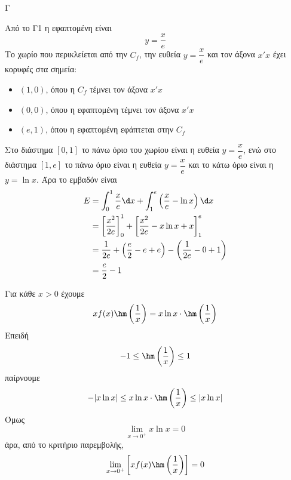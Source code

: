 \begin{thema}{Γ}
\begin{erwthma}
\item Από το Γ1 η εφαπτομένη είναι
\[y=\frac{x}{e}\]
Το χωρίο που περικλείεται από την $C_f$, την ευθεία $y=\dfrac{x}{e}$ και τον άξονα $x'x$ έχει κορυφές στα σημεία:
\begin{itemize}
\item $(1,0)$, όπου η $C_f$ τέμνει τον άξονα $x'x$
\item $(0,0)$, όπου η εφαπτομένη τέμνει τον άξονα $x'x$
\item $(e,1)$, όπου η εφαπτομένη εφάπτεται στην $C_f$
\end{itemize}
Στο διάστημα $[0,1]$ το πάνω όριο του χωρίου είναι η ευθεία $y=\dfrac{x}{e}$, ενώ στο διάστημα $[1,e]$ το πάνω όριο είναι η ευθεία $y=\dfrac{x}{e}$ και το κάτω όριο είναι η $y=\ln x$.
Άρα το εμβαδόν είναι
\begin{align*}
E&=\dint_0^1 \frac{x}{e}\d x+\dint_1^e\left(\frac{x}{e}-\ln x\right)\d x\\
&=\left[\frac{x^2}{2e}\right]_0^1+\left[\frac{x^2}{2e}-x\ln x+x\right]_1^e\\
&=\frac{1}{2e}+\left(\frac{e}{2}-e+e\right)-\left(\frac{1}{2e}-0+1\right)\\
&=\frac{e}{2}-1
\end{align*}

\item Για κάθε $x>0$ έχουμε
\[x f(x)\hm\left(\frac{1}{x}\right)=x\ln x\cdot \hm\left(\frac{1}{x}\right)\]
Επειδή
\[-1\leq \hm\left(\frac{1}{x}\right)\leq 1\]
παίρνουμε
\[-|x\ln x|\leq x\ln x\cdot \hm\left(\frac{1}{x}\right)\leq |x\ln x|\]
Όμως
\[\lim\limits_{x\to 0^+}x\ln x=0\]
άρα, από το κριτήριο παρεμβολής,
\[\lim\limits_{x\to 0^+}\left[x f(x)\hm\left(\frac{1}{x}\right)\right]=0\]
\end{erwthma}
\end{thema}

